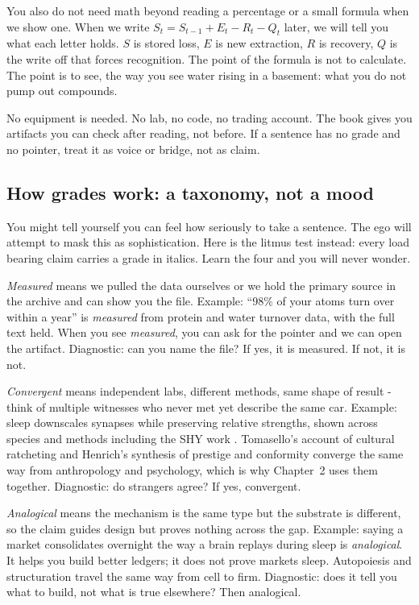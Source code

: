 You also do not need math beyond reading a percentage or a small formula when we show one. When we write $S_t = S_{t-1} + E_t - R_t - Q_t$ later, we will tell you what each letter holds. $S$ is stored loss, $E$ is new extraction, $R$ is recovery, $Q$ is the write off that forces recognition. The point of the formula is not to calculate. The point is to see, the way you see water rising in a basement: what you do not pump out compounds.

No equipment is needed. No lab, no code, no trading account. The book gives you artifacts you can check after reading, not before. If a sentence has no grade and no pointer, treat it as voice or bridge, not as claim.

\subsection*{How grades work: a taxonomy, not a mood}

You might tell yourself you can feel how seriously to take a sentence. The ego will attempt to mask this as sophistication. Here is the litmus test instead: every load bearing claim carries a grade in italics. Learn the four and you will never wonder.

\textit{Measured} means we pulled the data ourselves or we hold the primary source in the archive and can show you the file. Example: ``98\% of your atoms turn over within a year'' is \textit{measured} from protein and water turnover data, with the full text held. When you see \textit{measured}, you can ask for the pointer and we can open the artifact. Diagnostic: can you name the file? If yes, it is measured. If not, it is not.

\textit{Convergent} means independent labs, different methods, same shape of result - think of multiple witnesses who never met yet describe the same car. Example: sleep downscales synapses while preserving relative strengths, shown across species and methods including the SHY work \citep{baars1988,clark2016,seth2021}. Tomasello's account of cultural ratcheting \citep{tomasello} and Henrich's synthesis of prestige and conformity \citep{henrich} converge the same way from anthropology and psychology, which is why Chapter~2 uses them together. Diagnostic: do strangers agree? If yes, convergent.

\textit{Analogical} means the mechanism is the same type but the substrate is different, so the claim guides design but proves nothing across the gap. Example: saying a market consolidates overnight the way a brain replays during sleep is \textit{analogical}. It helps you build better ledgers; it does not prove markets sleep. Autopoiesis \citep{maturana1980} and structuration travel the same way from cell to firm. Diagnostic: does it tell you what to build, not what is true elsewhere? Then analogical.

